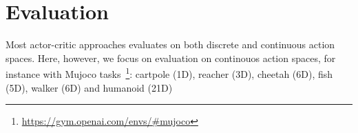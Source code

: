 \section{Evaluation}













Most actor-critic approaches evaluates on both discrete and continuous action spaces.
Here, however, we focus on evaluation on continouos action spaces,
for instance with Mujoco tasks~\footnote{\url{https://gym.openai.com/envs/\#mujoco}}:
cartpole (1D), reacher (3D), cheetah (6D), fish (5D), walker (6D) and humanoid (21D)



